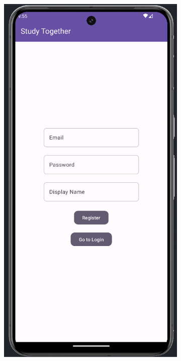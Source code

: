 \begin{figure}[H]
  \begin{subfigure}[b]{0.3\textwidth}
    \includegraphics[width=\textwidth]{Figures/Product_Images/Auth/register.png}

\end{subfigure}
\end{figure}
